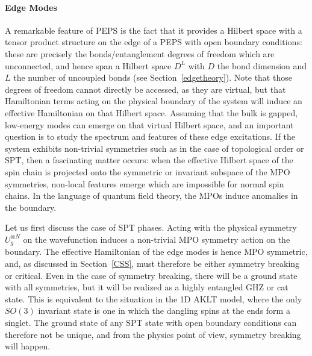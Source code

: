 \documentclass[rmp,aps,reprint,superscriptaddress,nobalancelastpage]{revtex4-1}
\begin{document}
\paragraph{Edge Modes}
A remarkable feature of PEPS is the fact that it provides a Hilbert space with a tensor product structure on the edge of a PEPS with open boundary conditions: these are precisely the bonds/entanglement degrees of freedom which are unconnected, and hence span a Hilbert space $D^{L}$ with $D$ the bond dimension and $L$ the number of uncoupled bonds (see Section~\ref{edgetheory}). Note that those degrees of freedom cannot directly be accessed, as they are virtual, but that Hamiltonian terms acting on the physical boundary of the system will induce an effective Hamiltonian on that Hilbert space. Assuming that the bulk is gapped, low-energy modes can emerge on that virtual Hilbert space, and an important question is to study the spectrum and features of these edge excitations. If the system exhibits non-trivial symmetries such as in the case of topological order or SPT, then a fascinating matter occurs: when the effective Hilbert space of the spin chain is projected onto the symmetric or invariant subspace of the MPO symmetries, non-local features emerge which are impossible for normal spin chains. In the language of quantum field theory, the MPOs induce anomalies in the boundary.

Let us first discuss the case of SPT phases. Acting with the physical symmetry $U_g^{\otimes N}$ on the wavefunction induces a non-trivial MPO symmetry action on the boundary. The effective Hamiltonian of the edge modes
is hence MPO symmetric, and, as discussed in Section~\ref{CSS}, must therefore be either symmetry breaking or critical. Even  in the case of symmetry breaking, there will be a ground state with all symmetries, but it will be realized as a highly entangled GHZ or cat state. This is equivalent to the situation in the 1D AKLT model, where the only $SO(3)$ invariant state is one in which the dangling spins at the ends form a singlet. The ground state of any SPT state with open boundary conditions can therefore not be unique, and from the physics point of view, symmetry breaking will happen.
\end{document}
